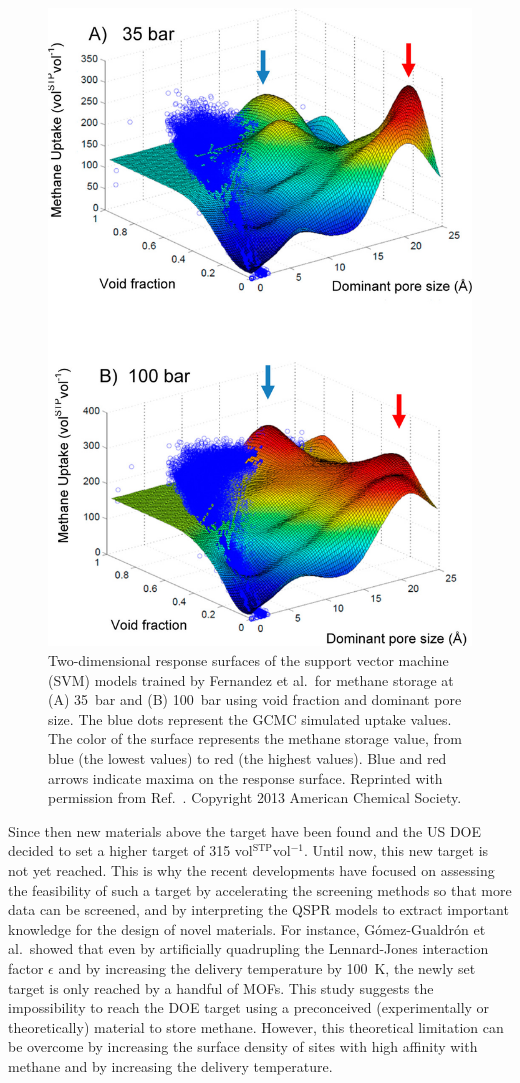 \documentclass[main.tex]{subfiles}
\begin{document}
\begin{figure}[ht]
\centering
  \includegraphics[width=0.5\linewidth]{figures/1-screening/Fernandez_2013_feature.jpeg}
  \caption{Two-dimensional response surfaces of the support vector machine (SVM) models trained by Fernandez et al.\ for methane storage at (A) 35~bar and (B) 100~bar using void fraction and dominant pore size. The blue dots represent the GCMC simulated uptake values. The color of the surface represents the methane storage value, from blue (the lowest values) to red (the highest values). Blue and red arrows indicate maxima on the response surface. Reprinted with permission from Ref.~. Copyright 2013 American Chemical Society.}
  \label{fgr:Fernandez_2013}
\end{figure}

Since then new materials above the target have been found and the US DOE decided to set a higher target of 315 vol{\footnotesize$^\mathrm{STP}$}vol$^{-1}$. Until now, this new target is not yet reached. This is why the recent developments have focused on assessing the feasibility of such a target by accelerating the screening methods so that more data can be screened, and by interpreting the QSPR models to extract important knowledge for the design of novel materials. For instance, G{\'{o}}mez-Gualdr{\'{o}}n et al.\ showed that even by artificially quadrupling the Lennard-Jones interaction factor $\epsilon$ and by increasing the delivery temperature by \SI{100}{\kelvin}, the newly set target is only reached by a handful of MOFs.\cite{Gomez_Gualdron_2014} This study suggests the impossibility to reach the DOE target using a preconceived (experimentally or theoretically) material to store methane. However, this theoretical limitation can be overcome by increasing the surface density of sites with high affinity with methane and by increasing the delivery temperature.
\end{document}
